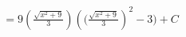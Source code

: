 \documentclass[preview]{standalone}
\begin{document}
\begin{align*}
&=9(\frac{\sqrt{x^2+9}}{3})({(\frac{\sqrt{x^2+9}}{3}})^2-3)+C \\
\end{align*}
\end{document}
